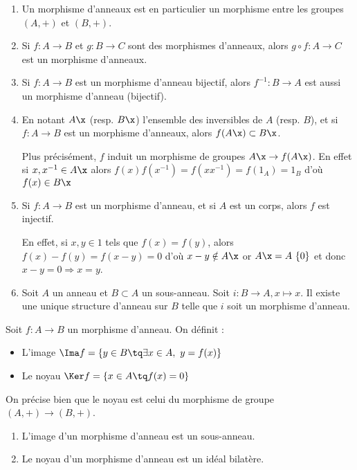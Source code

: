 \begin{example}[Remarques]
\begin{enumerate}
 \item Un morphisme d'anneaux est en particulier un morphisme entre les
groupes $(A,+)$ et $(B,+)$.
 \item Si $f : A \rightarrow B$ et $g : B \rightarrow C$ sont des morphismes
d'anneaux, alors $g\circ f : A \rightarrow C$ est un morphisme d'anneaux.
 \item Si $f : A \rightarrow B$ est un morphisme d'anneau bijectif, alors
$f^{-1} : B \rightarrow A$ est aussi un morphisme d'anneau (bijectif).
 \item En notant $A\x$ (resp. $B\x$) l'ensemble des inversibles de
$A$ (resp. $B$), et si $f : A \rightarrow B$ est un morphisme d'anneaux, alors
$f(A\x) \subset B\x$.

Plus précisément, $f$ induit un morphisme de groupes $A\x \rightarrow
f(A\x)$. En effet si $x, x^{-1} \in A\x$ alors $f(x) f(x^{-1}) =
f(xx^{-1}) = f(1_A) = 1_B$ d'où $f(x) \in B\x$
\item Si $f : A \rightarrow B$ est un morphisme d'anneau, et si $A$ est un
corps, alors $f$ est injectif. 

En effet, si $x,y \in 1$ tels que $f(x) = f(y)$, alors $f(x) - f(y) = f(x-y) =
0$ d'où $x-y \notin A\x$ or $A\x = A \ \{0\}$ et donc $x-y = 0
\Rightarrow x = y$.
\item Soit $A$ un anneau et $B \subset A$ un sous-anneau. Soit $i : B
\rightarrow A, x \mapsto x$. Il existe une unique structure d'anneau sur $B$
telle que $i$ soit un morphisme d'anneau.
\end{enumerate}
\end{example}

\begin{defi}

 Soit $f : A \rightarrow B$ un morphisme d'anneau. On définit :
\begin{itemize}
 \item L'image $\Ima f = \{y \in B \tq \exists x \in A,\ y = f(x)\}$
 \item Le noyau $\Ker f = \{x \in A \tq f(x) = 0\}$
\end{itemize}

On précise bien que le noyau est celui du morphisme de groupe $(A,+)
\rightarrow (B,+)$.
\end{defi}


\begin{prop}
 
\begin{enumerate}
 \item L'image d'un morphisme d'anneau est un sous-anneau.
 \item Le noyau d'un morphisme d'anneau est un idéal bilatère.
\end{enumerate}
\end{prop}

